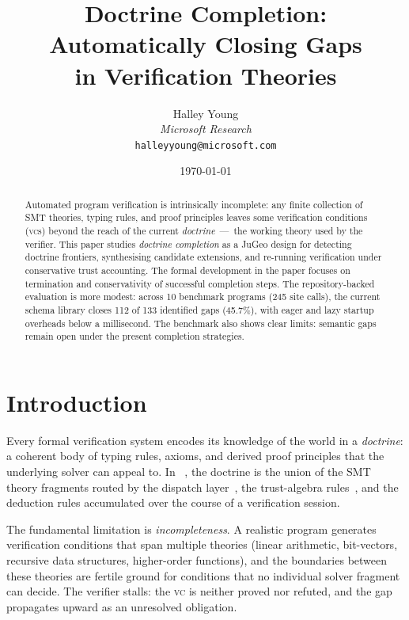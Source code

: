 \documentclass[11pt]{article}
\title{\textbf{Doctrine Completion: Automatically Closing Gaps\\
       in Verification Theories}}
\author{%
  Halley Young\\
  \textit{Microsoft Research}\\
  \texttt{halleyyoung@microsoft.com}
}
\date{\today}
\begin{document}
\maketitle

\begin{abstract}
Automated program verification is intrinsically incomplete: any finite
collection of SMT theories, typing rules, and proof principles leaves
some verification conditions (\textsc{vc}s) beyond the reach of the
current \emph{doctrine}~---~the working theory used by the verifier.
This paper studies \emph{doctrine completion} as a JuGeo design for
detecting doctrine frontiers, synthesising candidate extensions, and
re-running verification under conservative trust accounting.  The
formal development in the paper focuses on termination and
conservativity of successful completion steps.  The repository-backed
evaluation is more modest: across 10 benchmark programs (245 site
calls), the current schema library closes 112 of 133 identified gaps
(45.7\%), with eager and lazy startup overheads below a millisecond.
The benchmark also shows clear limits: semantic gaps remain open under
the present completion strategies.
\end{abstract}

\newpage

\section{Introduction}\label{sec:intro}

Every formal verification system encodes its knowledge of the world in
a \emph{doctrine}: a coherent body of typing rules, axioms, and derived
proof principles that the underlying solver can appeal to.  In
\JuGeo~\cite{JuGeo2023}, the doctrine is the union of the SMT theory
fragments routed by the dispatch layer~\cite{JuGeo05}, the trust-algebra
rules~\cite{JuGeo04}, and the deduction rules accumulated over the
course of a verification session.

The fundamental limitation is \emph{incompleteness}.  A realistic
program generates verification conditions that span multiple theories
(linear arithmetic, bit-vectors, recursive data structures, higher-order
functions), and the boundaries between these theories are fertile ground
for conditions that no individual solver fragment can decide.  The
verifier stalls: the \textsc{vc} is neither proved nor refuted, and the
gap propagates upward as an unresolved obligation.
\end{document}
